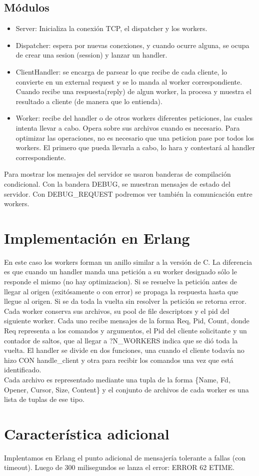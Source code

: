 \documentclass[a4paper,12pt]{article}
\begin{document}
    \subsection*{Módulos\\}
    \begin{itemize}
    \item Server: Inicializa la conexión TCP, el dispatcher y los workers.
    \item Dispatcher: espera por nuevas conexiones, y cuando ocurre alguna, se ocupa de crear una sesion (session) y lanzar un handler.
    \item ClientHandler: se encarga de parsear lo que recibe de cada cliente, lo convierte en un external request y se lo manda al worker correspondiente. Cuando recibe una respuesta(reply) de algun worker, la procesa y muestra el resultado a cliente (de manera que lo entienda).
    \item Worker: recibe del handler o de otros workers diferentes peticiones, las cuales intenta llevar a cabo. Opera sobre sus archivos cuando es necesario. Para optimizar las operaciones, no es necesario que una peticion pase por todos los workers. El primero que pueda llevarla a cabo, lo hara y contestará al handler correspondiente.
    \end{itemize}
    Para mostrar los mensajes del servidor se usaron banderas de compilación condicional. Con la bandera DEBUG, se muestran mensajes de estado del servidor. Con DEBUG\_REQUEST podremos ver también la comunicación entre workers.
    
\section*{Implementación en Erlang}
    En este caso los workers forman un anillo similar a la versión de C. La diferencia es que cuando un handler manda una petición a su worker designado sólo le responde el mismo (no hay optimizacion). Si se resuelve la petición antes de llegar al origen (exitósamente o con error) se propaga la respuesta hasta que llegue al origen. Si se da toda la vuelta sin resolver la petición se retorna error. Cada worker conserva sus archivos, su pool de file descriptors y el pid del siguiente worker. Cada uno recibe mensajes de la forma {Req, Pid, Count}, donde Req representa a los comandos y argumentos, el Pid del cliente solicitante y un contador de saltos, que al llegar a ?N\_WORKERS indica que se dió toda la vuelta.
    El handler se divide en dos funciones, una cuando el cliente todavía no hizo CON handle\_client y otra para recibir los comandos una vez que está identificado.\\
    Cada archivo es representado mediante una tupla de la forma \{Name, Fd, Opener, Cursor, Size, Content\} y el conjunto de archivos de cada worker es una lista de tuplas de ese tipo.

\section*{Característica adicional}
    Implentamos en Erlang el punto adicional de mensajería tolerante a fallas (con timeout). Luego de 300 milisegundos se lanza el error: ERROR 62 ETIME. 
\end{document}
